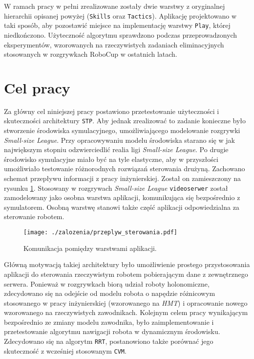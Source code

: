  W ramach pracy w pełni zrealizowane zostały dwie warstwy z oryginalnej hierarchii opisanej powyżej (\texttt{Skills} oraz \texttt{Tactics}). Aplikację projektowano w taki sposób, aby pozostawić miejsce
 na implementację warstwy \texttt{Play}, której niedkończono.
Użyteczność algorytmu sprawdzono podczas przeprowadzonych eksperymentów, wzorowanych na rzeczywistych zadaniach eliminacyjnych stosowanych w rozgrywkach RoboCup w ostatnich latach.

\section{Cel pracy}
Za główny cel niniejszej pracy postawiono przetestowanie użyteczności i skuteczności architektury \texttt{STP}. Aby jednak zrealizować to zadanie konieczne było
stworzenie środowiska symulacyjnego, umożliwiającego modelowanie rozgrywki \emph{Small-size League}. Przy opracowywaniu modelu środowiska starano się w jak największym stopniu odzwierciedlić realia
ligi \emph{Small-size League}. Po drugie środowisko symulacyjne miało być na tyle elastyczne, aby w przyszłości umożliwiało testowanie różnorodnych rozwiązań sterowania drużyną.
Zachowano schemat przepływu informacji z pracy inżynierskiej. Został on zamieszczony na rysunku \ref{fig:przeplyw_sterowania}. Stosowany w rozgrywach \emph{Small-size League} \texttt{videoserwer} został
zamodelowany jako osobna warstwa  aplikacji, komunikująca się bezpośrednio z symulatorem. Osobną warstwę stanowi także część aplikacji odpowiedzialna za sterowanie robotem.
\begin{figure}[H]
\centering
\texttt{[image: ./zalozenia/przeplyw\_sterowania.pdf]}
\caption{Komunikacja pomiędzy warstwami aplikacji.} \label{fig:przeplyw_sterowania}
\end{figure}
Główną motywacją takiej architektury było umożliwienie prostego przystosowania aplikacji do sterowania rzeczywistym robotem pobierającym dane z zewnętrznego serwera. 
Ponieważ w rozgrywkach biorą udział roboty holonomiczne, zdecydowano się na odejście od modelu robota o napędzie różnicowym stosowanego w pracy inżynierskiej (wzorowanego na \textit{HMT}) i opracowanie nowego wzorowanego na rzeczywistych
zawodnikach.
Kolejnym celem pracy wynikającym bezpośrednio ze zmiany modelu zawodnika, było zaimplementowanie i przetestowanie algorytmu nawigacji robota w dynamicznym środowisku. Zdecydowano się na algorytm \texttt{RRT},
postanowiono także porównać jego skuteczność z wcześniej stosowanym \texttt{CVM}.

